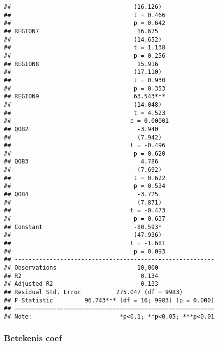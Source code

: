 \documentclass[
]{article}
\begin{document}
\begin{verbatim}
##                                   (16.126)               
##                                   t = 0.466              
##                                   p = 0.642              
## REGION7                            16.675                
##                                   (14.652)               
##                                   t = 1.138              
##                                   p = 0.256              
## REGION8                            15.916                
##                                   (17.110)               
##                                   t = 0.930              
##                                   p = 0.353              
## REGION9                           63.543***              
##                                   (14.048)               
##                                   t = 4.523              
##                                  p = 0.00001             
## QOB2                               -3.940                
##                                    (7.942)               
##                                  t = -0.496              
##                                   p = 0.620              
## QOB3                                4.786                
##                                    (7.692)               
##                                   t = 0.622              
##                                   p = 0.534              
## QOB4                               -3.725                
##                                    (7.871)               
##                                  t = -0.473              
##                                   p = 0.637              
## Constant                          -80.593*               
##                                   (47.936)               
##                                  t = -1.681              
##                                   p = 0.093              
## ---------------------------------------------------------
## Observations                       10,000                
## R2                                  0.134                
## Adjusted R2                         0.133                
## Residual Std. Error          275.047 (df = 9983)         
## F Statistic         96.743*** (df = 16; 9983) (p = 0.000)
## =========================================================
## Note:                         *p<0.1; **p<0.05; ***p<0.01
\end{verbatim}

\subsubsection{Betekenis coef}\label{betekenis-coef}
\end{document}
